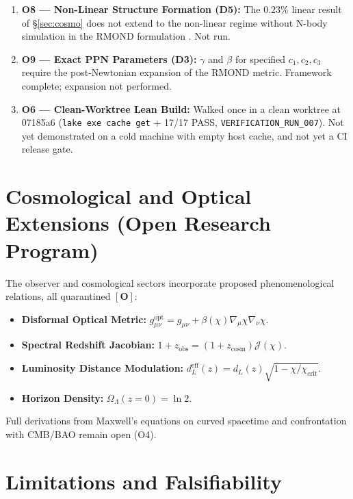 \documentclass[aps,prd,preprint,superscriptaddress,nofootinbib,amsmath,amssymb,floatfix]{revtex4-2}
\begin{document}
\begin{enumerate}
    \item \textbf{O8 --- Non-Linear Structure Formation (D5):} The $0.23\%$ linear result of \S\ref{sec:cosmo} does not extend to the non-linear regime without N-body simulation in the RMOND formulation \cite{Thomas2023}. Not run.
    \item \textbf{O9 --- Exact PPN Parameters (D3):} $\gamma$ and $\beta$ for specified $c_1,c_2,c_3$ require the post-Newtonian expansion of the RMOND metric. Framework complete; expansion not performed.
    \item \textbf{O6 --- Clean-Worktree Lean Build:} Walked once in a clean worktree at 07185a6 (\texttt{lake exe cache get} + 17/17 PASS, \texttt{VERIFICATION\_RUN\_007}). Not yet demonstrated on a cold machine with empty host cache, and not yet a CI release gate.
\end{enumerate}

\section{Cosmological and Optical Extensions (Open Research Program)}
\label{sec:optical_open}

The observer and cosmological sectors incorporate proposed phenomenological relations, all quarantined $\mathbf{[O]}$:
\begin{itemize}
    \item \textbf{Disformal Optical Metric:} $g_{\mu\nu}^{\text{opt}} = g_{\mu\nu} + \beta(\chi)\nabla_\mu\chi\nabla_\nu\chi$.
    \item \textbf{Spectral Redshift Jacobian:} $1+z_{\text{obs}} = (1+z_{\text{cosm}})\mathcal{J}(\chi)$.
    \item \textbf{Luminosity Distance Modulation:} $d_L^{\text{eff}}(z) = d_L(z)\sqrt{1-\chi/\chi_{\text{crit}}}$.
    \item \textbf{Horizon Density:} $\Omega_\Lambda(z=0) = \ln 2$.
\end{itemize}
Full derivations from Maxwell's equations on curved spacetime and confrontation with CMB/BAO remain open (O4).

\section{Limitations and Falsifiability}
\label{sec:falsifiability}
\end{document}
